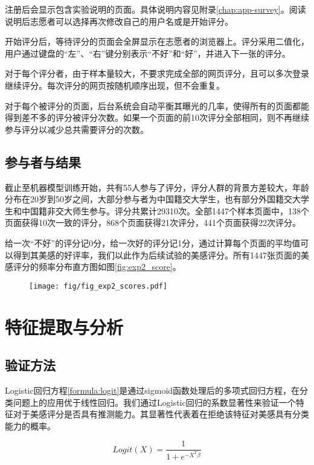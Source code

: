 注册后会显示包含实验说明的页面。具体说明内容见附录\ref{chap:app-survey}。阅读说明后志愿者可以选择再次修改自己的用户名或是开始评分。

开始评分后，等待评分的页面会全屏显示在志愿者的浏览器上。评分采用二值化，用户通过键盘的“左”、“右”键分别表示“不好”和“好”，并进入下一张的评分。

对于每个评分者，由于样本量较大，不要求完成全部的网页评分，且可以多次登录继续评分。每次评分的网页按随机顺序出现，但不会重复。

对于每个被评分的页面，后台系统会自动平衡其曝光的几率，使得所有的页面都能得到差不多的评分被评分次数。如果一个页面的前10次评分全部相同，则不再继续参与评分以减少总共需要评分的次数。

\subsection{参与者与结果}
截止至机器模型训练开始，共有55人参与了评分，评分人群的背景方差较大，年龄分布在20岁到50岁之间，大部分参与者为中国籍交大学生，也有部分外国籍交大学生和中国籍非交大师生参与。评分共累计29310次。全部1447个样本页面中，138个页面获得10次一致的评分，868个页面获得21次评分，441个页面获得22次评分。

给一次“不好”的评分记0分，给一次好的评分记1分，通过计算每个页面的平均值可以得到其美感的好评率，我们以此作为后续试验的美感评分。所有1447张页面的美感评分的频率分布直方图如图\ref{fig:exp2_score}。

\begin{figure}[H]
  \centering
  \texttt{[image: fig/fig\_exp2\_scores.pdf]}
\end{figure}

\section{特征提取与分析}
\subsection{验证方法}
Logistic回归方程\ref{formula:logit}是通过sigmoid函数处理后的多项式回归方程，在分类问题上的应用优于线性回归。我们通过Logistic回归的系数显著性来验证一个特征对于美感评分是否具有推测能力。其显著性代表着在拒绝该特征对美感具有分类能力的概率。

\begin{equation}
  Logit(X) = \frac{1}{1 + e^{-X^{T}\beta}}
  \label{formula:logit}
\end{equation}

